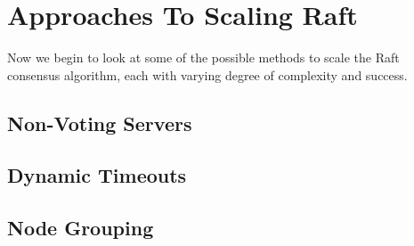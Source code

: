 \section{Approaches To Scaling Raft}

Now we begin to look at some of the possible methods to scale the Raft consensus algorithm, each with varying degree of complexity and success.

\subsection{Non-Voting Servers}

\subsection{Dynamic Timeouts}

\subsection{Node Grouping}
